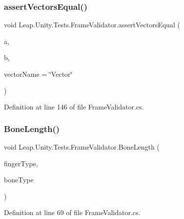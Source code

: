 \subsubsection{\texorpdfstring{assertVectorsEqual()}{assertVectorsEqual()}}
{\footnotesize\ttfamily void Leap.\+Unity.\+Tests.\+Frame\+Validator.\+assert\+Vectors\+Equal (\begin{DoxyParamCaption}\item[{\mbox{\hyperlink{struct_leap_1_1_vector}{Vector}}}]{a,  }\item[{\mbox{\hyperlink{struct_leap_1_1_vector}{Vector}}}]{b,  }\item[{string}]{vector\+Name = {\ttfamily \char`\"{}Vector\char`\"{}} }\end{DoxyParamCaption})\hspace{0.3cm}{\ttfamily [protected]}}



Definition at line 146 of file Frame\+Validator.\+cs.

\mbox{\label{class_leap_1_1_unity_1_1_tests_1_1_frame_validator_a7938771f1e92c2be05903222ad872182}} 
\subsubsection{\texorpdfstring{BoneLength()}{BoneLength()}}
{\footnotesize\ttfamily void Leap.\+Unity.\+Tests.\+Frame\+Validator.\+Bone\+Length (\begin{DoxyParamCaption}\item[{\mbox{[}\+Value\+Source(typeof(\+Frame\+Validator), \char`\"{}\+\_\+fingers\char`\"{})\mbox{]} \mbox{\hyperlink{class_leap_1_1_finger_ae75e8d46a01aff0bd5c6d6fb99e2f2ba}{Finger.\+Finger\+Type}}}]{finger\+Type,  }\item[{\mbox{[}\+Value\+Source(typeof(\+Frame\+Validator), \char`\"{}\+\_\+bones\char`\"{})\mbox{]} \mbox{\hyperlink{class_leap_1_1_bone_a21054e31cefa7b75f25a026006fdbb1b}{Bone.\+Bone\+Type}}}]{bone\+Type }\end{DoxyParamCaption})}



Definition at line 69 of file Frame\+Validator.\+cs.

\mbox{\label{class_leap_1_1_unity_1_1_tests_1_1_frame_validator_a3c1a4a5978be1544fc8b0570f4b31218}} 
